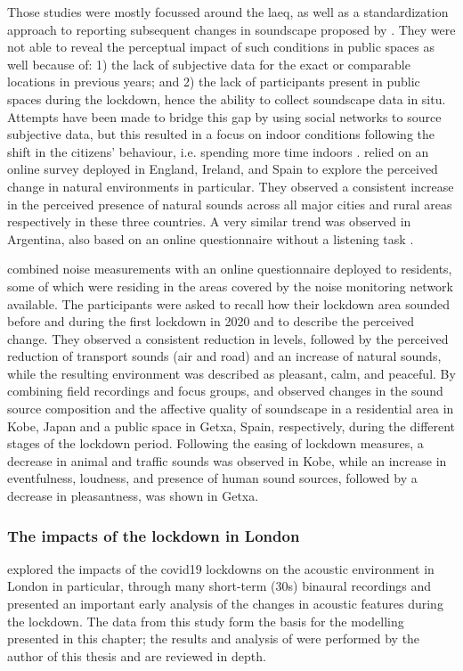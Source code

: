  Those studies were mostly focussed around the \gls{laeq}, as well as a standardization approach to reporting subsequent changes in soundscape proposed by \citet{Asensio2020Taxonomy}. They were not able to reveal the perceptual impact of such conditions in public spaces as well because of: 1) the lack of subjective data for the exact or comparable locations in previous years; and 2) the lack of participants present in public spaces during the lockdown, hence the ability to collect soundscape data in situ. Attempts have been made to bridge this gap by using social networks to source subjective data, but this resulted in a focus on indoor conditions following the shift in the citizens' behaviour, i.e. spending more time indoors \citep{Bartalucci2021survey,Lee2021Attitudes}. \citet{GarridoCumbrera2021Perceptions} relied on an online survey deployed in England, Ireland, and Spain to explore the perceived change in natural environments in particular. They observed a consistent increase in the perceived presence of natural sounds across all major cities and rural areas respectively in these three countries. A very similar trend was observed in Argentina, also based on an online questionnaire without a listening task \citep{Maggi2021Perception}. 
 
 \citet{Munoz2020Lockdown} combined noise measurements with an online questionnaire deployed to residents, some of which were residing in the areas covered by the noise monitoring network available. The participants were asked to recall how their lockdown area sounded before and during the first lockdown in 2020 and to describe the perceived change. They observed a consistent reduction in levels, followed by the perceived reduction of transport sounds (air and road) and an increase of natural sounds, while the resulting environment was described as pleasant, calm, and peaceful. By combining field recordings and focus groups, \citet{Sakagami2020How} and \citet{Lenzi2021Soundscape} observed changes in the sound source composition and the affective quality of soundscape in a residential area in Kobe, Japan and a public space in Getxa, Spain, respectively, during the different stages of the lockdown period. Following the easing of lockdown measures, a decrease in animal and traffic sounds was observed in Kobe, while an increase in eventfulness, loudness, and presence of human sound sources, followed by a decrease in pleasantness, was shown in Getxa.

 \subsubsection{The impacts of the lockdown in London}
 \citet{Aletta2020Assessing} explored the impacts of the \gls{covid19} lockdowns on the acoustic environment in London in particular, through many short-term (30s) binaural recordings and presented an important early analysis of the changes in acoustic features during the lockdown. The data from this study form the basis for the modelling presented in this chapter; the results and analysis of \citep{Aletta2020Assessing} were performed by the author of this thesis and are reviewed in depth. 

